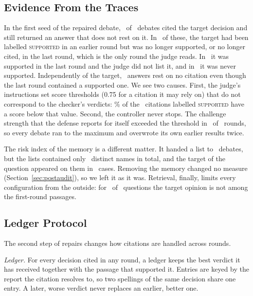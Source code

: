 \documentclass[conference]{IEEEtran}
\begin{document}
\subsection{Evidence From the Traces}
In the first seed of the repaired debate, \ResLossLost\ of \ResLossCases\ debates cited the target decision and still returned an answer that does not rest on it. In \ResLossSupportedEarlierOnly\ of these, the target had been labelled \textsc{supported} in an earlier round but was no longer supported, or no longer cited, in the last round, which is the only round the judge reads. In \ResLossSupportedLastNotUsed\ it was supported in the last round and the judge did not list it, and in \ResLossNeverSupported\ it was never supported. Independently of the target, \ResLossAnswersEmptyAlthoughSupported\ answers rest on no citation even though the last round contained a supported one. We see two causes. First, the judge's instructions set score thresholds (0.75 for a citation it may rely on) that do not correspond to the checker's verdicts: \ResLossSupportedBelowJudgeThreshold\% of the \ResLossSupportedCitations\ citations labelled \textsc{supported} have a score below that value. Second, the controller never stops. The challenge strength that the defense reports for itself exceeded the threshold in \ResLossChallengeAboveThreshold\ of \ResLossRounds\ rounds, so every debate ran to the maximum and overwrote its own earlier results twice.

The risk index of the memory is a different matter. It handed a list to \ResLossAvoidDebates\ debates, but the lists contained only \ResLossAvoidNames\ distinct names in total, and the target of the question appeared on them in \ResLossAvoidOwnTarget\ cases. Removing the memory changed no measure (Section~\ref{sec:postaudit}), so we left it as it was. Retrieval, finally, limits every configuration from the outside: for \ResRetSystemMissEight\ of \ResRetQuestions\ questions the target opinion is not among the first-round passages.

\subsection{Ledger Protocol}
The second step of repairs changes how citations are handled across rounds.

\emph{Ledger.} For every decision cited in any round, a ledger keeps the best verdict it has received together with the passage that supported it. Entries are keyed by the report the citation resolves to, so two spellings of the same decision share one entry. A later, worse verdict never replaces an earlier, better one.
\end{document}
